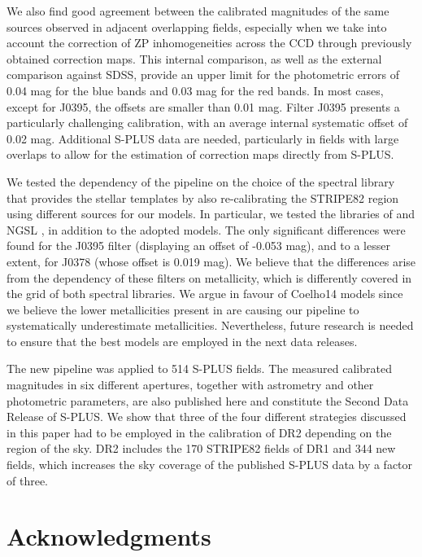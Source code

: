 \documentclass[fleqn,usenatbib]{mnras}
\begin{document}
We also find good agreement between the calibrated magnitudes of the same sources observed in adjacent overlapping fields, especially when we take into account the correction of ZP inhomogeneities across the CCD through previously obtained correction maps. This internal comparison, as well as the external comparison against SDSS, provide an upper limit for the photometric errors of 0.04 mag for the blue bands and 0.03 mag for the red bands. In most cases, except for J0395, the offsets are smaller than 0.01 mag. Filter J0395 presents a particularly challenging calibration, with an average internal systematic offset of 0.02 mag. Additional S-PLUS data are needed, particularly in fields with large overlaps to allow for the estimation of correction maps directly from S-PLUS.

We tested the dependency of the pipeline on the choice of the spectral library that provides the stellar templates by also re-calibrating the STRIPE82 region using different sources for our models. In particular, we tested the libraries of \citet{Castelli+Kurucz2003} and NGSL \citep{Heap2007}, in addition to the adopted \citet{Coelho14} models. The only significant differences were found for the J0395 filter (displaying an offset of -0.053 mag), and to a lesser extent, for J0378 (whose offset is 0.019 mag). We believe that the differences arise from the dependency of these filters on metallicity, which is differently covered in the grid of both spectral libraries. We argue in favour of Coelho14 models since we believe the lower metallicities present in \citet{Castelli+Kurucz2003} are causing our pipeline to systematically underestimate metallicities. Nevertheless, future research is needed to ensure that the best models are employed in the next data releases.

The new pipeline was applied to 514 S-PLUS fields. The measured calibrated magnitudes in six different apertures, together with astrometry and other photometric parameters, are also published here and constitute the Second Data Release of S-PLUS.  We show that three of the four different strategies discussed in this paper had to be employed in the calibration of DR2 depending on the region of the sky. DR2 includes the 170 STRIPE82 fields of DR1 and 344 new fields, which increases the sky coverage of the published S-PLUS data by a factor of three.

\section*{Acknowledgments}
\end{document}
